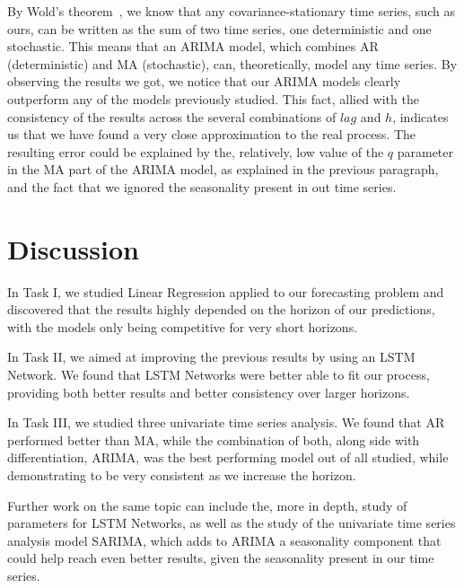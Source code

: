 \documentclass[10pt]{article}
\begin{document}
By Wold's theorem~\cite{WOLD}, we know that any covariance-stationary time series, such as ours, can be written as the sum of two time series, one deterministic and one stochastic. This means that an ARIMA model, which combines AR (deterministic) and MA (stochastic), can, theoretically, model any time series. By observing the results we got, we notice that our ARIMA models clearly outperform any of the models previously studied. This fact, allied with the consistency of the results across the several combinations of $lag$ and $h$, indicates us that we have found a very close approximation to the real process. The resulting error could be explained by the, relatively, low value of the $q$ parameter in the MA part of the ARIMA model, as explained in the previous paragraph, and the fact that we ignored the seasonality present in out time series.

\section*{Discussion}

In Task I, we studied Linear Regression applied to our forecasting problem and discovered that the results highly depended on the horizon of our predictions, with the models only being competitive for very short horizons.

In Task II, we aimed at improving the previous results by using an LSTM Network. We found that LSTM Networks were better able to fit our process, providing both better results and better consistency over larger horizons.

In Task III, we studied three univariate time series analysis. We found that AR performed better than MA, while the combination of both, along side with differentiation, ARIMA, was the best performing model out of all studied, while demonstrating to be very consistent as we increase the horizon.

Further work on the same topic can include the, more in depth, study of parameters for LSTM Networks, as well as the study of the univariate time series analysis model SARIMA, which adds to ARIMA a seasonality component that could help reach even better results, given the seasonality present in our time series.

\printbibliography
\end{document}
